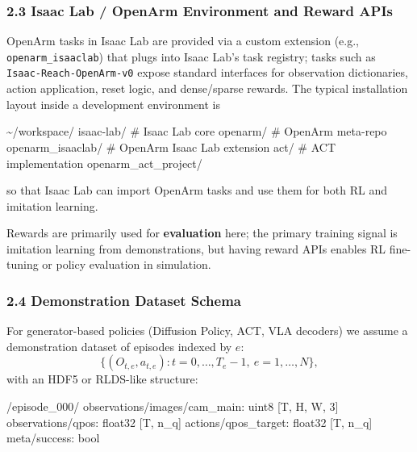 \documentclass[
]{article}
\newenvironment{Shaded}{}{}
\newcommand{\NormalTok}[1]{#1}
\theoremstyle{remark}
\begin{document}
\subsubsection{2.3 Isaac Lab / OpenArm Environment and Reward
APIs}\label{isaac-lab-openarm-environment-and-reward-apis}

OpenArm tasks in Isaac Lab are provided via a custom extension (e.g.,
\texttt{openarm\_isaaclab}) that plugs into Isaac Lab's task registry;
tasks such as \texttt{Isaac-Reach-OpenArm-v0} expose standard interfaces
for observation dictionaries, action application, reset logic, and
dense/sparse rewards. The typical installation layout inside a
development environment is \cite{act-openarm-notes,isaaclab-github}

\begin{Shaded}
\begin{Highlighting}[]
\NormalTok{\textasciitilde{}/workspace/}
\NormalTok{  isaac{-}lab/         \# Isaac Lab core}
\NormalTok{  openarm/           \# OpenArm meta{-}repo}
\NormalTok{  openarm\_isaaclab/  \# OpenArm Isaac Lab extension}
\NormalTok{  act/               \# ACT implementation}
\NormalTok{  openarm\_act\_project/}
\end{Highlighting}
\end{Shaded}

so that Isaac Lab can import OpenArm tasks and use them for both RL and
imitation learning. \cite{act-openarm-notes}

Rewards are primarily used for \textbf{evaluation} here; the primary
training signal is imitation learning from demonstrations, but having
reward APIs enables RL fine-tuning or policy evaluation in
simulation. \cite{isaaclab-github,act-openarm-notes}

\subsubsection{2.4 Demonstration Dataset
Schema}\label{demonstration-dataset-schema}

For generator-based policies (Diffusion Policy, ACT, VLA decoders) we
assume a demonstration dataset of episodes indexed by \(e\): \[
\{ (O_{t,e}, a_{t,e}) : t = 0,\dots,T_e-1,\ e = 1,\dots,N \},
\] with an HDF5 or RLDS-like structure: \cite{act-openarm-notes}

\begin{Shaded}
\begin{Highlighting}[]
\NormalTok{/episode\_000/}
\NormalTok{  observations/images/cam\_main: uint8 [T, H, W, 3]}
\NormalTok{  observations/qpos:  float32 [T, n\_q]}
\NormalTok{  actions/qpos\_target: float32 [T, n\_q]}
\NormalTok{  meta/success: bool}
\end{Highlighting}
\end{Shaded}
\end{document}
